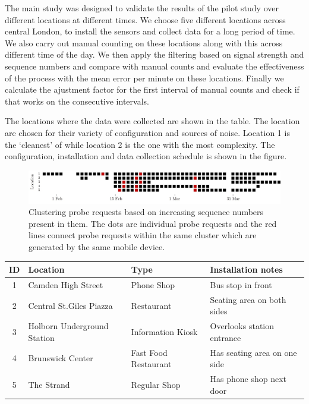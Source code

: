 The main study was designed to validate the results of the pilot study over different locations at different times. 
We choose five different locations across central London, to install the sensors and collect data for a long period of time. 
We also carry out manual counting on these locations along with this across different time of the day. 
We then apply the filtering based on signal strength and sequence numbers and compare with manual counts and evaluate the effectiveness of the process with the mean error per minute on these locations. 
Finally we calculate the ajustment factor for the first interval of manual counts and check if that works on the consecutive intervals. 

The locations where the data were collected are shown in the table. The location are chosen for their variety of configuration and sources of noise. Location 1 is the `cleanest' of while location 2 is the one with the most complexity. The configuration, installation and data collection schedule is shown in the figure. 

\begin{figure}
	\begin{center}
		\includegraphics [width=\linewidth] {images/main_schedule.jpeg}
		\caption{Clustering probe requests based on increasing sequence numbers present in them. The dots are individual probe requests and the red lines connect probe requests within the same cluster which are generated by the same mobile device.}
		\label{pilot_clustering}
	\end{center}
\end{figure}

\begin{table}
	{\begin{tabular}{clll} 
		\toprule
		 ID & Location & Type & Installation notes\\
		 \midrule
		 1 & Camden High Street & Phone Shop & Bus stop in front\\
		 2 & Central St.Giles Piazza & Restaurant & Seating area on both sides\\
		 3 & Holborn Underground Station & Information Kiosk & Overlooks station entrance\\
		 4 & Brunswick Center & Fast Food Restaurant & Has seating area on one side\\
		 5 & The Strand & Regular Shop & Has phone shop next door \\
		 \bottomrule
	\end{tabular}}
	\label{locations-table}
\end{table}

